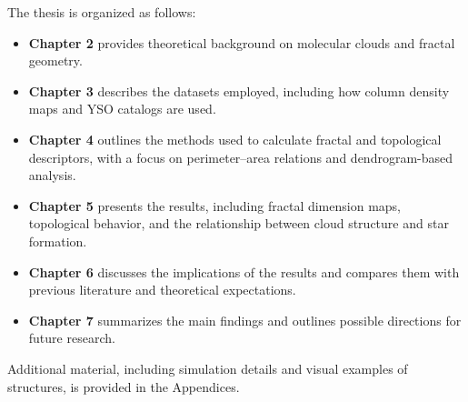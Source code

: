 The thesis is organized as follows:
\begin{itemize}
    \item \textbf{Chapter 2} provides theoretical background on molecular clouds and fractal geometry.
    \item \textbf{Chapter 3} describes the datasets employed, including how column density maps and YSO catalogs are used.
    \item \textbf{Chapter 4} outlines the methods used to calculate fractal and topological descriptors, with a focus on perimeter–area relations and dendrogram-based analysis.
    \item \textbf{Chapter 5} presents the results, including fractal dimension maps, topological behavior, and the relationship between cloud structure and star formation.
    \item \textbf{Chapter 6} discusses the implications of the results and compares them with previous literature and theoretical expectations.
    \item \textbf{Chapter 7} summarizes the main findings and outlines possible directions for future research.
\end{itemize}

Additional material, including simulation details and visual examples of structures, is provided in the Appendices.
